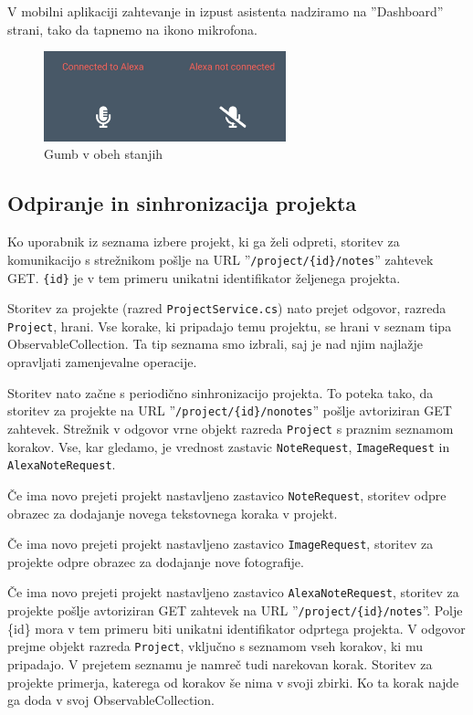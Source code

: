 \documentclass[a4paper, 12pt]{book}
\begin{document}
V mobilni aplikaciji zahtevanje in izpust asistenta nadziramo na ''Dashboard'' strani, tako da tapnemo na ikono mikrofona.

\begin{figure}[H]
\begin{center}
\includegraphics[width=7cm]{app_alexa_yesno}
\end{center}
	\caption{Gumb v obeh stanjih}
\label{app_alexa_yesno}
\end{figure}

\subsection{Odpiranje in sinhronizacija projekta}

Ko uporabnik iz seznama izbere projekt, ki ga želi odpreti, storitev za komunikacijo s strežnikom pošlje na URL ''\texttt{/project/\{id\}/notes}'' zahtevek GET.
\texttt{\{id\}} je v tem primeru unikatni identifikator željenega projekta.

Storitev za projekte (razred \texttt{ProjectService.cs}) nato prejet odgovor, razreda \texttt{Project}, hrani.
Vse korake, ki pripadajo temu projektu, se hrani v seznam tipa ObservableCollection.
Ta tip seznama smo izbrali, saj je nad njim najlažje opravljati zamenjevalne operacije.

Storitev nato začne s periodično sinhronizacijo projekta.
To poteka tako, da storitev za projekte na URL ''\texttt{/project/\{id\}/nonotes}'' pošlje avtoriziran GET zahtevek.
Strežnik v odgovor vrne objekt razreda \texttt{Project} s praznim seznamom korakov.
Vse, kar gledamo, je vrednost zastavic \texttt{NoteRequest}, \texttt{ImageRequest} in \texttt{AlexaNoteRequest}.

Če ima novo prejeti projekt nastavljeno zastavico \texttt{NoteRequest}, storitev odpre obrazec za dodajanje novega tekstovnega koraka v projekt.

Če ima novo prejeti projekt nastavljeno zastavico \texttt{ImageRequest}, storitev za projekte odpre obrazec za dodajanje nove fotografije.

Če ima novo prejeti projekt nastavljeno zastavico \texttt{AlexaNoteRequest}, storitev za projekte pošlje avtoriziran GET zahtevek na URL ''\texttt{/project/\{id\}/notes}''.
Polje \{id\} mora v tem primeru biti unikatni identifikator odprtega projekta.
V odgovor prejme objekt razreda \texttt{Project}, vključno s seznamom vseh korakov, ki mu pripadajo.
V prejetem seznamu je namreč tudi narekovan korak.
Storitev za projekte primerja, katerega od korakov še nima v svoji zbirki.
Ko ta korak najde ga doda v svoj ObservableCollection.
\end{document}
